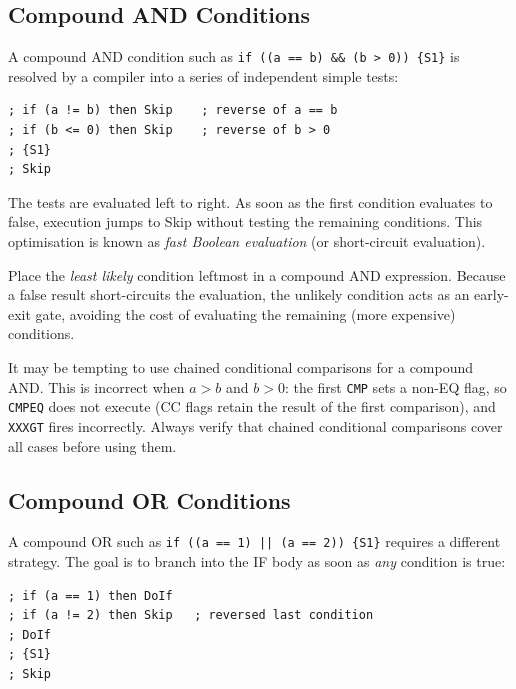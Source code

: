\documentclass[11pt, a4paper, notitlepage]{report}
\theoremstyle{definition}
\theoremstyle{remark}
\theoremstyle{definition}
\begin{document}
\subsection{Compound AND Conditions}

A compound AND condition such as \texttt{if ((a == b) \&\& (b > 0)) \{S1\}} is resolved by a compiler into a series of independent simple tests:

\begin{lstlisting}
; if (a != b) then Skip    ; reverse of a == b
; if (b <= 0) then Skip    ; reverse of b > 0
; {S1}
; Skip
\end{lstlisting}

The tests are evaluated left to right. As soon as the first condition evaluates to false, execution jumps to Skip without testing the remaining conditions. This optimisation is known as \emph{fast Boolean evaluation} (or short-circuit evaluation).

\begin{keyresult}[title={Optimising Compound AND}]
Place the \emph{least likely} condition leftmost in a compound AND expression. Because a false result short-circuits the evaluation, the unlikely condition acts as an early-exit gate, avoiding the cost of evaluating the remaining (more expensive) conditions.
\end{keyresult}

\begin{warning}[title={Compound AND with Conditional Execution}]
It may be tempting to use chained conditional comparisons for a compound AND\@. This is incorrect when $a > b$ and $b > 0$: the first \texttt{CMP} sets a non-EQ flag, so \texttt{CMPEQ} does not execute (CC flags retain the result of the first comparison), and \texttt{XXXGT} fires incorrectly. Always verify that chained conditional comparisons cover all cases before using them.
\end{warning}

\subsection{Compound OR Conditions}

A compound OR such as \texttt{if ((a == 1) || (a == 2)) \{S1\}} requires a different strategy. The goal is to branch into the IF body as soon as \emph{any} condition is true:

\begin{lstlisting}
; if (a == 1) then DoIf
; if (a != 2) then Skip   ; reversed last condition
; DoIf
; {S1}
; Skip
\end{lstlisting}
\end{document}
